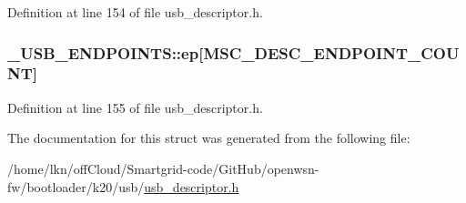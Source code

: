 Definition at line 154 of file usb\+\_\+descriptor.\+h.

\subsubsection[{\texorpdfstring{ep}{ep}}]{ \+\_\+\+U\+S\+B\+\_\+\+E\+N\+D\+P\+O\+I\+N\+T\+S\+::ep\mbox{[}{\bf M\+S\+C\+\_\+\+D\+E\+S\+C\+\_\+\+E\+N\+D\+P\+O\+I\+N\+T\+\_\+\+C\+O\+U\+NT}\mbox{]}}\hypertarget{struct___u_s_b___e_n_d_p_o_i_n_t_s_af7bbbc1e736ecd86e0956db528a112fc}{}\label{struct___u_s_b___e_n_d_p_o_i_n_t_s_af7bbbc1e736ecd86e0956db528a112fc}


Definition at line 155 of file usb\+\_\+descriptor.\+h.



The documentation for this struct was generated from the following file\+:\begin{DoxyCompactItemize}
\item 
/home/lkn/off\+Cloud/\+Smartgrid-\/code/\+Git\+Hub/openwsn-\/fw/bootloader/k20/usb/\hyperlink{usb__descriptor_8h}{usb\+\_\+descriptor.\+h}\end{DoxyCompactItemize}
